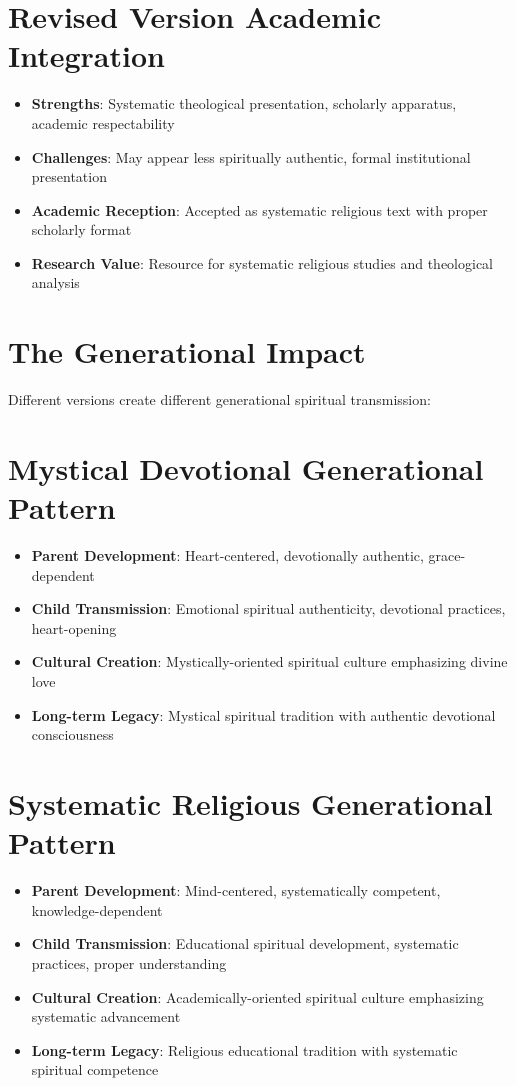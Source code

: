 \documentclass[11pt,twoside]{book}
\begin{document}
\section*{Revised Version Academic Integration}
\label{sec:org7948279}
\begin{itemize}
\item \textbf{\textbf{Strengths}}: Systematic theological presentation, scholarly apparatus, academic respectability
\item \textbf{\textbf{Challenges}}: May appear less spiritually authentic, formal institutional presentation
\item \textbf{\textbf{Academic Reception}}: Accepted as systematic religious text with proper scholarly format
\item \textbf{\textbf{Research Value}}: Resource for systematic religious studies and theological analysis
\end{itemize}
\section*{The Generational Impact}
\label{sec:org6e507d1}

Different versions create different generational spiritual transmission:
\section*{Mystical Devotional Generational Pattern}
\label{sec:org8b45fc1}
\begin{itemize}
\item \textbf{\textbf{Parent Development}}: Heart-centered, devotionally authentic, grace-dependent
\item \textbf{\textbf{Child Transmission}}: Emotional spiritual authenticity, devotional practices, heart-opening
\item \textbf{\textbf{Cultural Creation}}: Mystically-oriented spiritual culture emphasizing divine love
\item \textbf{\textbf{Long-term Legacy}}: Mystical spiritual tradition with authentic devotional consciousness
\end{itemize}
\section*{Systematic Religious Generational Pattern}
\label{sec:org754a95e}
\begin{itemize}
\item \textbf{\textbf{Parent Development}}: Mind-centered, systematically competent, knowledge-dependent
\item \textbf{\textbf{Child Transmission}}: Educational spiritual development, systematic practices, proper understanding
\item \textbf{\textbf{Cultural Creation}}: Academically-oriented spiritual culture emphasizing systematic advancement
\item \textbf{\textbf{Long-term Legacy}}: Religious educational tradition with systematic spiritual competence
\end{itemize}
\end{document}
